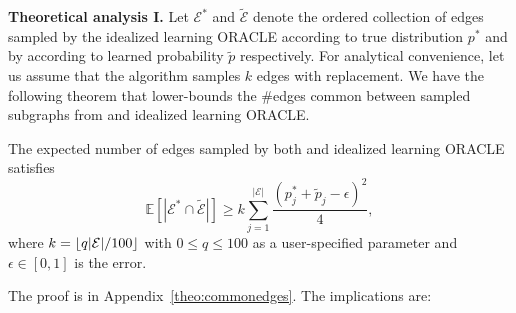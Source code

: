 \noindent\textbf{Theoretical analysis I.} 
Let $\mathcal{E}^*$ and $\mathcal{\tilde{E}}$ denote the ordered collection of edges sampled by the idealized learning ORACLE according to true distribution $p^*$ and by \sgs according to learned probability $\tilde{p}$ respectively. For analytical convenience, let us assume that the algorithm samples $k$ edges with replacement. We have the following theorem that lower-bounds the \#edges common between sampled subgraphs from \sgs and idealized learning ORACLE.

\begin{theorem} The expected number of edges sampled by both \sgs and idealized learning ORACLE satisfies
\vspace{-10pt}
\begin{equation} 
\mathbb{E}[|\mathcal{E}^* \cap \mathcal{\tilde{E}}|] \geq k \sum_{j=1}^{|\mathcal{E}|} \frac{(p^*_j + \tilde{p}_j - \epsilon)^2}{4},
\end{equation}
where $k = \lfloor q|\mathcal{E}|/100 \rfloor$ with $0 \leq q \leq 100$ as a user-specified parameter and $\epsilon\in [0,1]$ is the error.
\end{theorem}
The proof is in Appendix~\ref{theo:commonedges}. The implications are:
